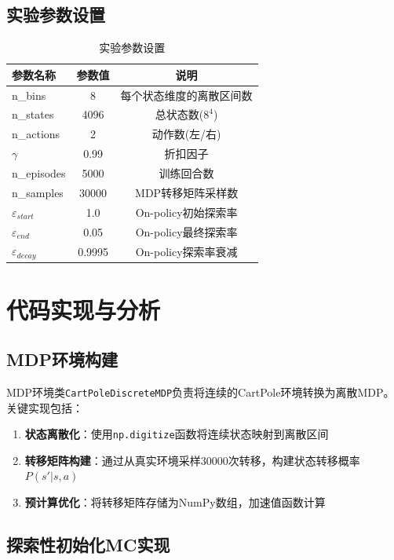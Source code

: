 \documentclass[12pt,a4paper]{article}
\begin{document}
\subsection{实验参数设置}

\begin{table}[H]
\centering
\caption{实验参数设置}
\begin{tabular}{lcc}
\toprule
\textbf{参数名称} & \textbf{参数值} & \textbf{说明} \\
\midrule
n\_bins & 8 & 每个状态维度的离散区间数 \\
n\_states & 4096 & 总状态数($8^4$) \\
n\_actions & 2 & 动作数(左/右) \\
$\gamma$ & 0.99 & 折扣因子 \\
n\_episodes & 5000 & 训练回合数 \\
n\_samples & 30000 & MDP转移矩阵采样数 \\
$\varepsilon_{start}$ & 1.0 & On-policy初始探索率 \\
$\varepsilon_{end}$ & 0.05 & On-policy最终探索率 \\
$\varepsilon_{decay}$ & 0.9995 & On-policy探索率衰减 \\
\bottomrule
\end{tabular}
\end{table}

\section{代码实现与分析}

\subsection{MDP环境构建}

MDP环境类\texttt{CartPoleDiscreteMDP}负责将连续的CartPole环境转换为离散MDP。关键实现包括：

\begin{enumerate}
    \item \textbf{状态离散化}：使用\texttt{np.digitize}函数将连续状态映射到离散区间
    \item \textbf{转移矩阵构建}：通过从真实环境采样30000次转移，构建状态转移概率$P(s'|s,a)$
    \item \textbf{预计算优化}：将转移矩阵存储为NumPy数组，加速值函数计算
\end{enumerate}

\subsection{探索性初始化MC实现}
\end{document}
